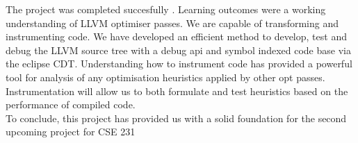 The project was completed succesfully . Learning outcomes were a working understanding of LLVM optimiser passes. We are capable of transforming and instrumenting code. We have developed an efficient method to develop, test and debug the LLVM source tree with a debug api and symbol indexed code base via the eclipse CDT. Understanding how to instrument code has provided a powerful tool for analysis of any optimisation heuristics applied by other opt passes. Instrumentation will allow us to both formulate and test heuristics based on the performance of compiled code.\\
To conclude, this project has provided us with a solid foundation for the second upcoming project for CSE 231
